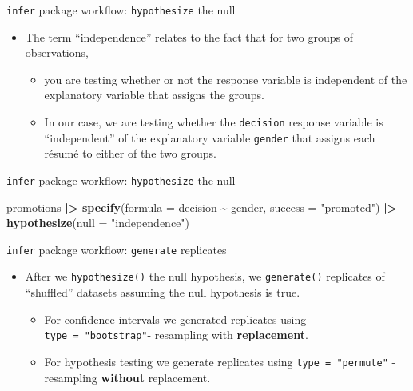 \documentclass[
  ignorenonframetext,
]{beamer}
\newenvironment{Shaded}{\begin{snugshade}}{\end{snugshade}}
\newcommand{\AttributeTok}[1]{\textcolor[rgb]{0.13,0.29,0.53}{#1}}
\newcommand{\FunctionTok}[1]{\textcolor[rgb]{0.13,0.29,0.53}{\textbf{#1}}}
\newcommand{\NormalTok}[1]{#1}
\newcommand{\SpecialCharTok}[1]{\textcolor[rgb]{0.81,0.36,0.00}{\textbf{#1}}}
\newcommand{\StringTok}[1]{\textcolor[rgb]{0.31,0.60,0.02}{#1}}
\providecommand{\tightlist}{%
  \setlength{\itemsep}{0pt}\setlength{\parskip}{0pt}}
\begin{document}
\begin{frame}[fragile]{\texttt{infer} package workflow:
\texttt{hypothesize} the null}
\protect\hypertarget{infer-package-workflow-hypothesize-the-null-2}{}
\begin{itemize}
\item
  The term ``independence'' relates to the fact that for two groups of
  observations,

  \begin{itemize}
  \tightlist
  \item
    you are testing whether or not the response variable is independent
    of the explanatory variable that assigns the groups.
  \item
    In our case, we are testing whether the \texttt{decision} response
    variable is ``independent'' of the explanatory variable
    \texttt{gender} that assigns each résumé to either of the two
    groups.
  \end{itemize}
\end{itemize}
\end{frame}

\begin{frame}[fragile]{\texttt{infer} package workflow:
\texttt{hypothesize} the null}
\protect\hypertarget{infer-package-workflow-hypothesize-the-null-3}{}
\begin{Shaded}
\begin{Highlighting}[]
\NormalTok{promotions }\SpecialCharTok{|\textgreater{}} 
  \FunctionTok{specify}\NormalTok{(}\AttributeTok{formula =}\NormalTok{ decision }\SpecialCharTok{\textasciitilde{}}\NormalTok{ gender, }
          \AttributeTok{success =} \StringTok{"promoted"}\NormalTok{) }\SpecialCharTok{|\textgreater{}} 
  \FunctionTok{hypothesize}\NormalTok{(}\AttributeTok{null =} \StringTok{"independence"}\NormalTok{)}
\end{Highlighting}
\end{Shaded}
\end{frame}

\begin{frame}[fragile]{\texttt{infer} package workflow:
\texttt{generate} replicates}
\protect\hypertarget{infer-package-workflow-generate-replicates}{}
\begin{itemize}
\item
  After we \texttt{hypothesize()} the null hypothesis, we
  \texttt{generate()} replicates of ``shuffled'' datasets assuming the
  null hypothesis is true.

  \begin{itemize}
  \item
    For confidence intervals we generated replicates using
    \texttt{type\ =\ "bootstrap"}- resampling with \textbf{replacement}.
  \item
    For hypothesis testing we generate replicates using
    \texttt{type\ =\ "permute"} - resampling \textbf{without}
    replacement.
  \end{itemize}
\end{itemize}
\end{frame}
\end{document}
